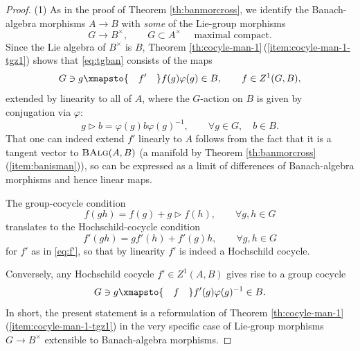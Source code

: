 \documentclass[10pt,a4paper]{amsart}
\numberwithin{equation}{section}
\newcommand{\cat}[1]{\text{\sc #1}}
\begin{document}
\begin{proof}
(1) As in the proof of Theorem \ref{th:banmorcross}, we identify the Banach-algebra morphisms $A\to B$ with {\it some} of the Lie-group morphisms
 \begin{equation*}
 G\to B^{\times},\qquad G\subset A^{\times}\quad\text{ maximal compact}.
 \end{equation*}
 Since the Lie algebra of $B^{\times}$ is $B$, Theorem \ref{th:cocyle-man-1}\,(\ref{item:cocyle-man-1-tgz1}) shows that \eqref{eq:tgban} consists of the maps
 \begin{equation}\label{eq:f'}
 G\ni g\xmapsto{\quad f'\quad} f(g)\varphi(g)\in B,\qquad f\in Z^1(G,B),
 \end{equation}
 extended by linearity to all of $A$, where the $G$-action on $B$ is given by conjugation via $\varphi$:
 \begin{equation*}
 g\triangleright b = \varphi(g)b\varphi(g)^{-1},\qquad \forall g\in G,\quad b\in B.
 \end{equation*}
 That one can indeed extend $f'$ linearly to $A$ follows from the fact that it is a tangent vector to $\cat{BAlg}(A,B)$ (a manifold by Theorem \ref{th:banmorcross}\,(\ref{item:banisman})), so can be expressed as a limit of differences of Banach-algebra morphisms and hence linear maps.

 The group-cocycle condition
 \begin{equation*}
 f(gh) = f(g) + g\triangleright f(h),\qquad \forall g,h\in G
 \end{equation*}
 translates to the Hochschild-cocycle condition
 \begin{equation*}
 f'(gh) = gf'(h) + f'(g)h,\qquad \forall g,h\in G
 \end{equation*}
 for $f'$ as in \eqref{eq:f'}, so that by linearity $f'$ is indeed a Hochschild cocycle.

 Conversely, any Hochschild cocycle $f'\in Z^1(A,B)$ gives rise to a group cocycle
 \begin{equation*}
 G\ni g\xmapsto{\quad f\quad} f'(g)\varphi(g)^{-1}\in B.
 \end{equation*}
 In short, the present statement is a reformulation of Theorem \ref{th:cocyle-man-1}\,(\ref{item:cocyle-man-1-tgz1}) in the very specific case of Lie-group morphisms $G\to B^{\times}$ extensible to Banach-algebra morphisms.


\end{proof}
\end{document}
